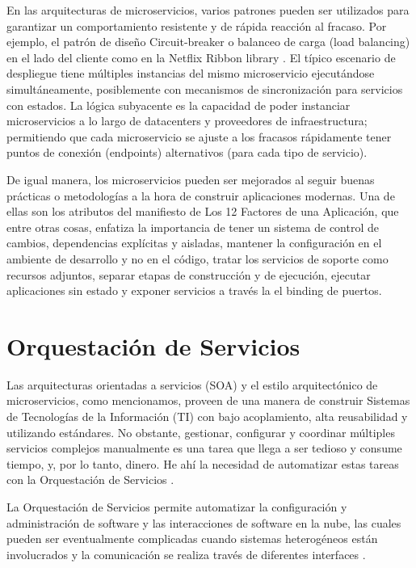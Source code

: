         En las arquitecturas de microservicios, varios patrones pueden ser utilizados para garantizar un comportamiento resistente y de rápida reacción al fracaso. Por ejemplo, el patrón de diseño Circuit-breaker \cite{Nygard2007-ed} o balanceo de carga (load balancing) en el lado del cliente como en la Netflix Ribbon library \cite{Netflix2016-ri}. El típico escenario de despliegue tiene múltiples instancias del mismo microservicio ejecutándose simultáneamente, posiblemente con mecanismos de sincronización para servicios con estados. La lógica subyacente es la capacidad de poder instanciar microservicios a lo largo de datacenters y proveedores de infraestructura; permitiendo que cada microservicio se ajuste a los fracasos rápidamente tener puntos de conexión (endpoints) alternativos (para cada tipo de servicio).
        
        De igual manera, los microservicios pueden ser mejorados al seguir buenas prácticas o metodologías a la hora de construir aplicaciones modernas. Una de ellas son los atributos del manifiesto de Los 12 Factores de una Aplicación, que entre otras cosas, enfatiza la importancia de tener un sistema de control de cambios, dependencias explícitas y aisladas, mantener la configuración en el ambiente de desarrollo y no en el código, tratar los servicios de soporte como recursos adjuntos, separar etapas de construcción y de ejecución, ejecutar aplicaciones sin estado y exponer servicios a través la el binding de puertos.

        
    \section{Orquestación de Servicios}
        Las arquitecturas orientadas a servicios (SOA) y el estilo arquitectónico de microservicios, como mencionamos, proveen de una manera de construir Sistemas de Tecnologías de la Información (TI) con bajo acoplamiento, alta reusabilidad y utilizando estándares. No obstante, gestionar, configurar y coordinar múltiples servicios complejos manualmente es una tarea que llega a ser tedioso y consume tiempo, y, por lo tanto, dinero. He ahí la necesidad de automatizar estas tareas con la Orquestación de Servicios \cite{Kapuruge2014-qq}.
        
        La Orquestación de Servicios permite automatizar la configuración y administración de software y las interacciones de software en la nube, las cuales pueden ser eventualmente complicadas cuando sistemas heterogéneos están involucrados y la comunicación se realiza través de diferentes interfaces \citeyear{Katsaros2016-bj}. 
        
